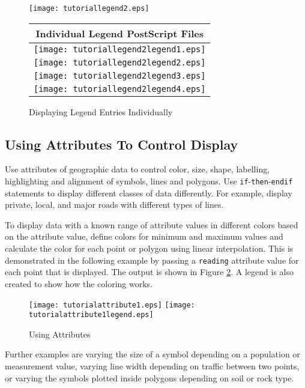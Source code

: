 \begin{figure}[htb]
\texttt{[image: tutoriallegend2.eps]}

\begin{tabular}{|c|}
\hline
Individual Legend PostScript Files \\
\hline
\texttt{[image: tutoriallegend2legend1.eps]} \\
\hline
\texttt{[image: tutoriallegend2legend2.eps]} \\
\hline
\texttt{[image: tutoriallegend2legend3.eps]} \\
\hline
\texttt{[image: tutoriallegend2legend4.eps]} \\
\hline
\end{tabular}

\caption{Displaying Legend Entries Individually}
\label{tutoriallegend2}
\end{figure}

\subsection{Using Attributes To Control Display}

Use attributes of geographic data to control
color, size, shape, labelling, highlighting and alignment of symbols, lines
and polygons.
Use \texttt{if}-\texttt{then}-\texttt{endif}
statements to display different classes of data
differently.  For example, display private, local, and major roads
with different types of lines.

To display data with a known range of attribute values in different
colors based on the attribute value, define colors for minimum and
maximum values and calculate the color for each point or polygon
using linear interpolation.  This is demonstrated in the following
example by passing a \texttt{reading} attribute value for each point
that is displayed.  The output is shown in Figure \ref{tutorialattribute1}.
A legend is also created to show how the coloring works.



\begin{figure}[htb]
\texttt{[image: tutorialattribute1.eps]}
\texttt{[image: tutorialattribute1legend.eps]}
\caption{Using Attributes}
\label{tutorialattribute1}
\end{figure}

Further examples are varying the size of a symbol depending on a
population or measurement value, varying line width depending on
traffic between two points, or varying the symbols plotted inside
polygons depending on soil or rock type.

